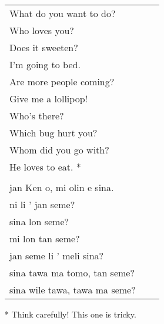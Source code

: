\begin{supertabular}{p{5,5cm}|ll}
What do you want to do? &&   \\ %
Who loves you? &&   \\ %
Does it sweeten?  &&  \\ %
I'm going to bed. && \\  %
Are more people coming? &&  \\  %
Give me a lollipop! && \\   %
Who's there? &&   \\ %
Which bug hurt you?  &&  \\ %
Whom did you go with? &&  \\  %
He loves to eat. * &&  \\ %
 && \\ %
jan Ken o, mi olin e sina.  && \\  %
ni li ' jan seme?  && \\  %
sina lon seme?   && \\  %
mi lon tan seme?  && \\  %
jan seme li ' meli sina?   && \\    %
sina tawa ma tomo, tan seme?    && \\   %
sina wile tawa, tawa  ma seme?      && \\  %
\end{supertabular} 

* Think carefully! This one is tricky. 
